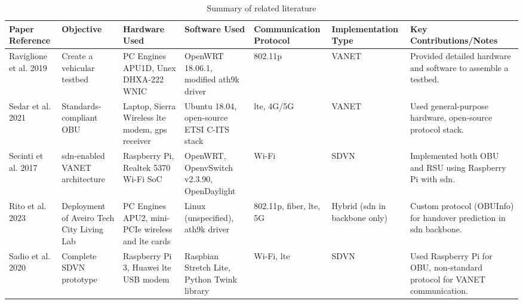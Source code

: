     \begin{table}[ht]
        \centering
        \begin{tabular}{|p{1.5cm}|p{1.7cm}|p{2cm}|p{1.6cm}|p{1.6cm}|p{1.8cm}|p{2.5cm}|}
        \hline
        \textbf{Paper Reference} & \textbf{Objective} & \textbf{Hardware Used} & \textbf{Software Used} & \textbf{Commu\-nication Protocol} & \textbf{Imple\-mentation Type} & \textbf{Key Contributions/Notes} \\ \hline
        
        Raviglione et al. 2019\cite{raviglione_open_2019} & Create a vehicular testbed & PC Engines APU1D, Unex DHXA-222 WNIC & OpenWRT 18.06.1, modified ath9k driver & 802.11p & VANET & Provided detailed hardware and software to assemble a testbed. \\ \hline
        
        Sedar et al. 2021\cite{sedar_standards-compliant_2021} & Standards-compliant OBU & Laptop, Sierra Wireless \gls{lte} modem, \gls{gps} receiver & Ubuntu 18.04, open-source ETSI C-ITS stack & \gls{lte}, 4G/5G & VANET & Used general-purpose hardware, open-source protocol stack. \\ \hline
        
        Secinti et al. 2017\cite{secinti_software_2017} & \gls{sdn}-enabled VANET architecture & Raspberry Pi, Realtek 5370 Wi-Fi SoC & OpenWRT, OpenvSwitch v2.3.90, OpenDaylight & Wi-Fi & SDVN & Implemented both OBU and RSU using Raspberry Pi with \gls{sdn}. \\ \hline
        
        Rito et al. 2023\cite{rito_aveiro_2023} & Deployment of Aveiro Tech City Living Lab & PC Engines APU2, mini-PCIe wireless and \gls{lte} cards & Linux (unspecified), ath9k driver & 802.11p, fiber, \gls{lte}, 5G & Hybrid (\gls{sdn} in backbone only) & Custom protocol (OBUInfo) for handover prediction in \gls{sdn} backbone. \\ \hline
        
        Sadio et al. 2020\cite{sadio_design_2020} & Complete SDVN prototype & Raspberry Pi 3, Huawei \gls{lte} USB modem & Raspbian Stretch Lite, Python Twink library & Wi-Fi, \gls{lte} & SDVN & Used Raspberry Pi for OBU, non-standard protocol for VANET communication. \\ \hline
        
        \end{tabular}
        \caption{Summary of related literature}
    \end{table}
        